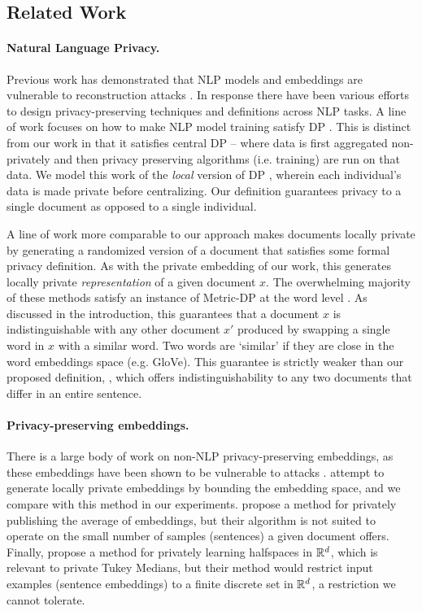 \subsection{Related Work}
\paragraph{Natural Language Privacy.} Previous work has demonstrated that NLP models and embeddings are vulnerable to reconstruction attacks \cite{carlini_attack, attack_word_embs, pan2020privacy}. In response there have been various efforts to design privacy-preserving techniques and definitions across NLP tasks. A line of work focuses on how to make NLP model training satisfy DP \cite{DP_training, DP_training_II}. This is distinct from our work in that it satisfies central DP -- where data is first aggregated non-privately and then privacy preserving algorithms (i.e. training) are run on that data. We model this work of the \emph{local} version of DP \cite{ldp}, wherein each individual's data is made private before centralizing. Our definition guarantees privacy to a single document as opposed to a single individual. 

A line of work more comparable to our approach makes documents locally private by generating a randomized version of a document that satisfies some formal privacy definition. As with the private embedding of our work, this generates locally private \emph{representation} of a given document $x$. The overwhelming majority of these methods satisfy an instance of Metric-DP \cite{orig_metricdp} at the word level \cite{metricdp,  mdp_low_dim, TEM, another_metric_DP, fancy_metricdp, metricDP_gumbel}. As discussed in the introduction, this guarantees that a document $x$ is indistinguishable with any other document $x'$ produced by swapping a single word in $x$ with a similar word. Two words are `similar' if they are close in the word embeddings space (e.g. GloVe). This guarantee is strictly weaker than our proposed definition, \SDP, which offers indistinguishability to any two documents that differ in an entire sentence. 

\paragraph{Privacy-preserving embeddings.} There is a large body of work on non-NLP privacy-preserving embeddings, as these embeddings have been shown to be vulnerable to attacks \cite{attack_on_embeddings}. \citet{clifton} attempt to generate locally private embeddings by bounding the embedding space, and we compare with this method in our experiments. \citet{kamath_high_dim} propose a method for privately publishing the average of embeddings, but their algorithm is not suited to operate on the small number of samples (sentences) a given document offers. Finally, \citet{private_halfspaces} propose a method for privately learning halfspaces in ${\mathbb R}^d$, which is relevant to private Tukey Medians, but their method would restrict input examples (sentence embeddings) to a finite discrete set in ${\mathbb R}^d$, a restriction we cannot tolerate. 



